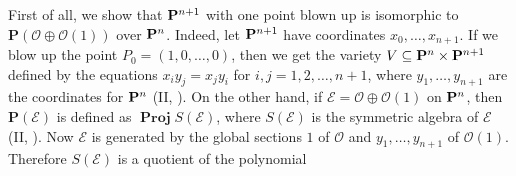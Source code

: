 {First of all, we show that $\mathbf{P}^{n+1}$ with one point blown up is isomorphic to $\mathbf P(\mathcal O\oplus\mathcal O(1))$ over $\mathbf{P}^n$. Indeed, let $\mathbf{P}^{n+1}$ have coordinates $x_0,\ldots,x_{n+1}$. If we blow up the point $P_0=(1,0,\ldots,0)$, then we get the variety $V\subseteq\mathbf{P}^n\times\mathbf{P}^{n+1}$ defined by the equations $x_i y_j=x_j y_i$ for $i,j=1,2,\ldots,n+1$, where $y_1,\ldots,y_{n+1}$ are the coordinates for $\mathbf{P}^n$ (II, ). On the other hand, if $\mathcal E=\mathcal O\oplus\mathcal O(1)$ on $\mathbf{P}^n$, then $\mathbf P(\mathcal E)$ is defined as $\operatorname{\mathbf{Proj}}S(\mathcal E)$, where $S(\mathcal E)$ is the symmetric algebra of $\mathcal E$ (II, ). Now $\mathcal E$ is generated by the global sections $1$ of $\mathcal O$ and $y_1,\ldots,y_{n+1}$ of $\mathcal O(1)$. Therefore $S(\mathcal E)$ is a quotient of the polynomial
}
